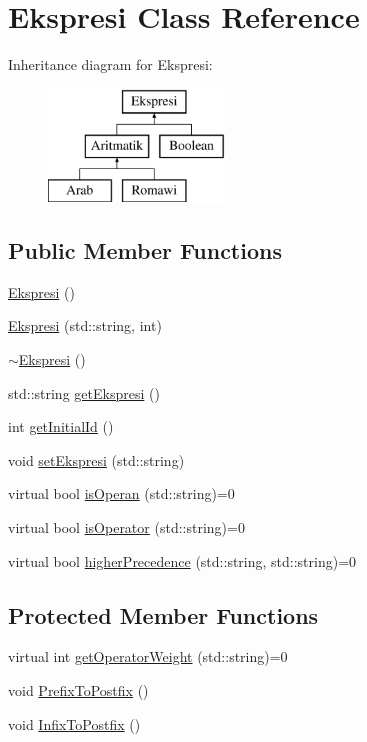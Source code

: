 \hypertarget{class_ekspresi}{}\section{Ekspresi Class Reference}
\label{class_ekspresi}
Inheritance diagram for Ekspresi\+:\begin{figure}[H]
\begin{center}
\leavevmode
\includegraphics[height=3.000000cm]{class_ekspresi}
\end{center}
\end{figure}
\subsection*{Public Member Functions}
\begin{DoxyCompactItemize}
\item 
\hyperlink{class_ekspresi_af2e8f739d94a28af80105222107f4d3e}{Ekspresi} ()
\item 
\hyperlink{class_ekspresi_ac39dbe3ebc56004cfb24649c36cb29a5}{Ekspresi} (std\+::string, int)
\item 
\hyperlink{class_ekspresi_ac385e453495f162dc5d98ded7f1ea30a}{$\sim$\+Ekspresi} ()
\item 
std\+::string \hyperlink{class_ekspresi_a40f6b3556c45c99ba94d4f19a420c025}{get\+Ekspresi} ()
\item 
int \hyperlink{class_ekspresi_aa1a9b559652450e0759da6b8231a2dd4}{get\+Initial\+Id} ()
\item 
void \hyperlink{class_ekspresi_a554bbd85ea4c39188e9b40a79993d048}{set\+Ekspresi} (std\+::string)
\item 
virtual bool \hyperlink{class_ekspresi_ab742ee9ef7a7bc49ea9d3d96eae69e04}{is\+Operan} (std\+::string)=0
\item 
virtual bool \hyperlink{class_ekspresi_a224d9cae2ee4d104d7ece7b853746dfc}{is\+Operator} (std\+::string)=0
\item 
virtual bool \hyperlink{class_ekspresi_a52ccbd282ee50c4c3d58eab0d662f0f9}{higher\+Precedence} (std\+::string, std\+::string)=0
\end{DoxyCompactItemize}
\subsection*{Protected Member Functions}
\begin{DoxyCompactItemize}
\item 
virtual int \hyperlink{class_ekspresi_a1177f9babe3330a4f04adbac396e0e0e}{get\+Operator\+Weight} (std\+::string)=0
\item 
void \hyperlink{class_ekspresi_aeb458e4d9a607aac1aa021bc13fde362}{Prefix\+To\+Postfix} ()
\item 
void \hyperlink{class_ekspresi_acb880011d232d3624844eab3753e6dbd}{Infix\+To\+Postfix} ()
\end{DoxyCompactItemize}
